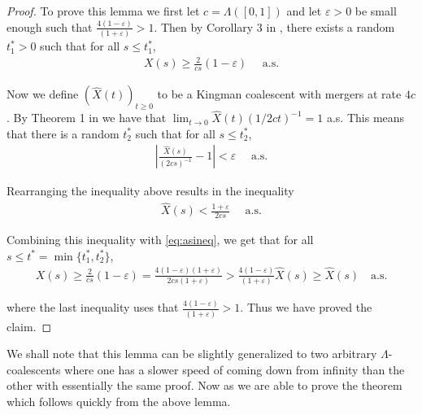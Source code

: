 \documentclass[11pt]{article}
\theoremstyle{definition}
\begin{document}
\begin{proof}
    To prove this lemma we first let $c = \Lambda([0,1])$ and let $\varepsilon > 0$ be small enough such that $\frac{4(1-\varepsilon)}{(1+\varepsilon)} > 1$. Then by Corollary 3 in \cite{speed}, there exists a random $t^*_1 > 0$ such that for all $s \leq t_1^*$,
    \begin{align}\label{eq:asineq}
        X(s) \geq \frac{2}{cs}(1-\varepsilon)\quad \text{ a.s.}
    \end{align}

    \noindent Now we define $(\widehat{X}(t))_{t \geq 0}$ to be a Kingman coalescent with mergers at rate $4c$. By Theorem 1 in \cite{speed} we have that $\lim_{t \to 0} \widehat{X}(t) (1/2ct)^{-1} = 1$ a.s. This means that there is a random $t_2^*$ such that for all $s \leq t^*_2$,
    \begin{align*}
        \left|\frac{\widehat{X}(s)}{(2cs)^{-1}} - 1\right| < \varepsilon\quad \text{ a.s.}
    \end{align*}

    \noindent Rearranging the inequality above results in the inequality
    \begin{align*}
        \widehat{X}(s) < \frac{1+\varepsilon}{2cs} \quad \text{ a.s.}
    \end{align*}

    \noindent Combining this inequality with \eqref{eq:asineq}, we get that for all $s \leq t^* = \min\{t_1^*, t_2^*\}$,
    \begin{align*}
        X(s) \geq \frac{2}{cs}(1-\varepsilon) = \frac{4(1-\varepsilon)(1+\varepsilon)}{2cs(1+\varepsilon)} > \frac{4(1-\varepsilon)}{(1+\varepsilon)} \widehat{X}(s) \geq \widehat{X}(s)\quad \text{a.s.}
    \end{align*}

    \noindent where the last inequality uses that $\frac{4(1-\varepsilon)}{(1+\varepsilon)} > 1$. Thus we have proved the claim.
\end{proof}

\noindent We shall note that this lemma can be slightly generalized to two arbitrary $\Lambda$-coalescents where one has a slower speed of coming down from infinity than the other with essentially the same proof. Now as we are able to prove the theorem which follows quickly from the above lemma.
\end{document}
